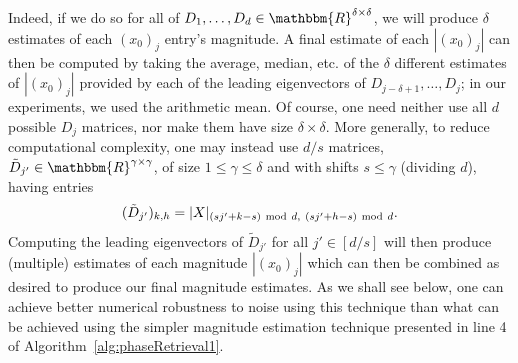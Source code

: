 Indeed, if we do so for all of $D_1, \dots, D_d \in \mathbbm{R}^{\delta \times \delta}$, we will produce $\delta$ estimates of each $(x_0)_{j}$ entry's magnitude.  A final estimate of each $|(x_0)_j|$ can then be computed by taking the average, median, etc. of the $\delta$ different estimates of $|(x_0)_j|$ provided by each of the leading eigenvectors of $D_{j-\delta+1}, \dots, D_j$; in our experiments, we used the arithmetic mean.  Of course, one need neither use all $d$ possible $D_j$ matrices, nor make them have size $\delta \times \delta$.  More generally, to reduce computational complexity, one may instead use $d/s$ matrices, $\tilde{D}_{j'} \in \mathbbm{R}^{\gamma \times \gamma}$, of size $1 \leq \gamma \leq \delta$ and with shifts $s \leq \gamma$ (dividing $d$), having entries $$(\tilde{D}_{j'})_{k,h} = |X|_{(sj'+k-s)~{\rm mod}~d,~(sj'+h-s)~{\rm mod}~d}.$$ Computing the leading eigenvectors of $\tilde{D}_{j'}$ for all $j' \in [d/s]$ will then produce (multiple) estimates of each magnitude $|(x_0)_j|$ which can then be combined as desired to produce our final magnitude estimates.  As we shall see below, one can achieve better numerical robustness to noise using this technique than what can be achieved using the simpler magnitude estimation technique presented in line 4 of Algorithm~\ref{alg:phaseRetrieval1}.

